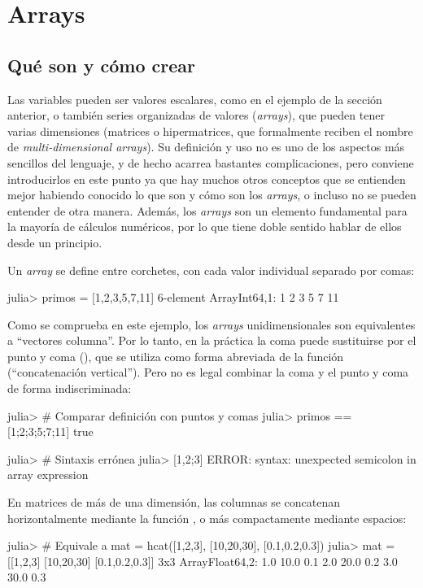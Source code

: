 \chapter{Arrays}

\section{Qué son y cómo crear }
Las variables pueden ser valores escalares, como en el ejemplo de la sección anterior, o también series organizadas de valores (\emph{arrays}), que pueden tener varias dimensiones (matrices o hipermatrices, que formalmente reciben el nombre de \emph{multi-dimensional arrays}). Su definición y uso no es uno de los aspectos más sencillos del lenguaje, y de hecho acarrea bastantes complicaciones, pero conviene introducirlos en este punto ya que hay muchos otros conceptos que se entienden mejor habiendo conocido lo que son y cómo son los \emph{arrays}, o incluso no se pueden entender de otra manera. Además, los \emph{arrays} son un elemento fundamental para la mayoría de cálculos numéricos, por lo que tiene doble sentido hablar de ellos desde un principio.

Un \emph{array} se define entre corchetes, con cada valor individual separado por comas:

\begin{jlconcode}
julia> primos = [1,2,3,5,7,11]
6-element Array{Int64,1}:
 1
 2
 3
 5
 7
 11
\end{jlconcode}

Como se comprueba en este ejemplo, los \emph{arrays} unidimensionales son equivalentes a ``vectores columna''. Por lo tanto, en la práctica la coma puede sustituirse por el punto y coma (\jl{;}), que se utiliza como forma abreviada de la función  (``concatenación vertical''). Pero no es legal combinar la coma y el punto y coma de forma indiscriminada:

\begin{jlconcode}
julia> # Comparar definición con puntos y comas
julia> primos == [1;2;3;5;7;11]
true

julia> # Sintaxis errónea
julia> [1,2;3]
ERROR: syntax: unexpected semicolon in array expression
\end{jlconcode}

En matrices de más de una dimensión, las columnas se concatenan horizontalmente mediante la función , o más compactamente mediante espacios:

\begin{jlconcode}
julia> # Equivale a mat = hcat([1,2,3], [10,20,30], [0.1,0.2,0.3])
julia> mat = [[1,2,3] [10,20,30] [0.1,0.2,0.3]]
3x3 Array{Float64,2}:
 1.0 10.0 0.1
 2.0 20.0 0.2
 3.0 30.0 0.3
\end{jlconcode}

